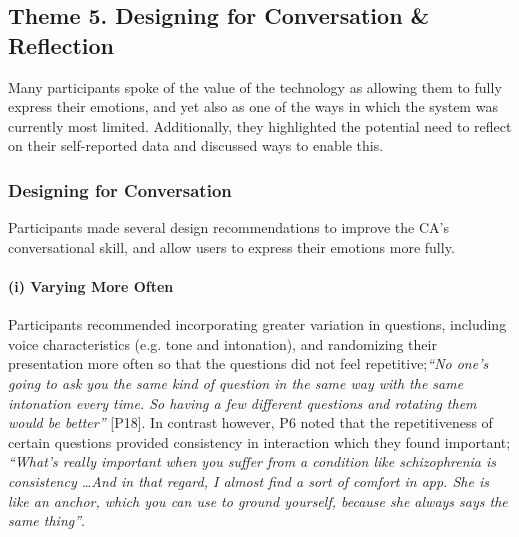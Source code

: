     \subsection{Theme 5. Designing for Conversation \& Reflection}\label{theme:design_recommendations}
    
        Many participants spoke of the value of the technology as allowing them to fully express their emotions, and yet also as one of the ways in which the system was currently most limited. Additionally, they highlighted the potential need to reflect on their self-reported data and discussed ways to enable this.
        
        \subsubsection{Designing for Conversation}\label{sec:improve_design}
            
            Participants made several design recommendations to improve the \ac{CA}'s conversational skill, and allow users to express their emotions more fully.
            
            \paragraph{(i) Varying More Often}
            
                Participants recommended incorporating greater variation in questions, including voice characteristics (e.g. tone and intonation), and randomizing their presentation more often so that the questions did not feel repetitive;\textit{``No one's going to ask you the same kind of question in the same way with the same intonation every time. So having a few different questions and rotating them would be better''} [P18]. In contrast however, P6 noted that the repetitiveness of certain questions provided consistency in interaction which they found important; \textit{``What's really important when you suffer from a condition like schizophrenia is consistency \ldots And in that regard, I almost find a sort of comfort in \acl{app}. She is like an anchor, which you can use to ground yourself, because she always says the same thing''}.
            
